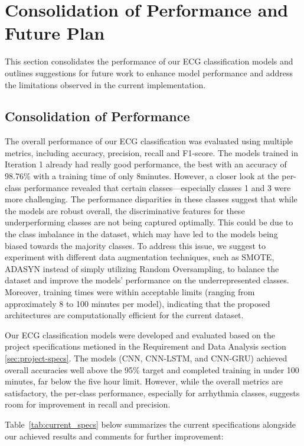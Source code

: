 \section{Consolidation of Performance and Future Plan}
This section consolidates the performance of our ECG classification models and outlines suggestions for future work to enhance model performance and address the limitations observed in the current implementation.

\subsection{Consolidation of Performance}
The overall performance of our ECG classification was evaluated using multiple metrics, including accuracy, precision, recall and F1-score. The models trained in Iteration 1 already had really good performance, the best with an accuracy of 98.76\% with a training time of only 8minutes.
However, a closer look at the per-class performance revealed that certain classes—especially classes 1 and 3 were more challenging. The performance disparities in these classes suggest that while the models are robust overall, the discriminative features for these underperforming classes are not being captured optimally. This could be due to the class imbalance in the dataset, which may have led to the models being biased towards the majority classes. To address this issue, we suggest to experiment with different data augmentation techniques, such as SMOTE, ADASYN instead of simply utilizing Random Oversampling, to balance the dataset and improve the models' performance on the underrepresented classes. 
Moreover, training times were within acceptable limits (ranging from approximately 8 to 100 minutes per model), indicating that the proposed architectures are computationally efficient for the current dataset.

Our ECG classification models were developed and evaluated based on the project specifications metioned in the Requirement and Data Analysis section \ref{sec:project-specs}. The models (CNN, CNN-LSTM, and CNN-GRU) achieved overall accuracies well above the 95\% target and completed training in under 100 minutes, far below the five hour limit. However, while the overall metrics are satisfactory, the per-class performance, especially for arrhythmia classes, suggests room for improvement in recall and precision.

Table~\ref{tab:current_specs} below summarizes the current specifications alongside our achieved results and comments for further improvement:

